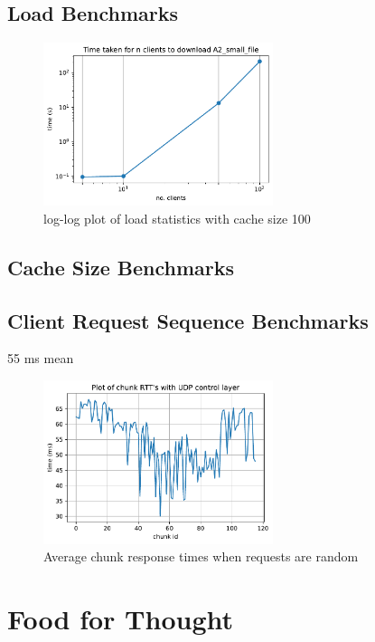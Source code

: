 \documentclass[12pt]{article}
\begin{document}
\subsection{Load Benchmarks}

\begin{figure}[H]
  \centering
  \includegraphics[width=0.6\textwidth]{time_clients.pdf}
  \caption{log-log plot of load statistics with cache size 100}
\end{figure}

\subsection{Cache Size Benchmarks}



\subsection{Client Request Sequence Benchmarks}

55 ms mean

\begin{figure}[H]
  \centering
  \includegraphics[width=0.6\textwidth]{random_req.pdf}
  \caption{Average chunk response times when requests are random}
\end{figure}

\section{Food for Thought}
\end{document}
